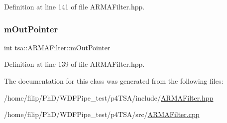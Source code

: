 Definition at line 141 of file A\+R\+M\+A\+Filter.\+hpp.

\mbox{\label{classtsa_1_1_a_r_m_a_filter_a223497bf7eb2f652a8c776f67837e6e9}} 
\subsubsection{\texorpdfstring{m\+Out\+Pointer}{mOutPointer}}
{\footnotesize\ttfamily int tsa\+::\+A\+R\+M\+A\+Filter\+::m\+Out\+Pointer\hspace{0.3cm}{\ttfamily [private]}}



Definition at line 139 of file A\+R\+M\+A\+Filter.\+hpp.



The documentation for this class was generated from the following files\+:\begin{DoxyCompactItemize}
\item 
/home/filip/\+Ph\+D/\+W\+D\+F\+Pipe\+\_\+test/p4\+T\+S\+A/include/\hyperlink{_a_r_m_a_filter_8hpp}{A\+R\+M\+A\+Filter.\+hpp}\item 
/home/filip/\+Ph\+D/\+W\+D\+F\+Pipe\+\_\+test/p4\+T\+S\+A/src/\hyperlink{_a_r_m_a_filter_8cpp}{A\+R\+M\+A\+Filter.\+cpp}\end{DoxyCompactItemize}
